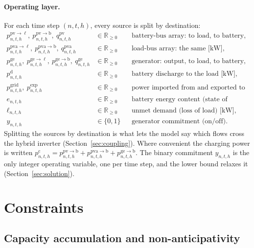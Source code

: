 \documentclass[11pt,a4paper]{article}
\theoremstyle{plain}
\theoremstyle{definition}
\newcommand{\Rpos}{\mathbb{R}_{\geq 0}}
\begin{document}
\paragraph{Operating layer.} For each time step $(n,t,h)$, every source is split by
destination:
\begin{align}
  p^{\mathrm{pv}\to\ell}_{n,t,h},\ p^{\mathrm{pv}\to\mathrm{b}}_{n,t,h},\
  q^{\mathrm{pv}}_{n,t,h} &\in \Rpos
    && \text{battery-bus array: to load, to battery, curtailed [kW],}\\
  p^{\mathrm{pva}\to\ell}_{n,t,h},\ p^{\mathrm{pva}\to\mathrm{b}}_{n,t,h},\
  q^{\mathrm{pva}}_{n,t,h} &\in \Rpos
    && \text{load-bus array: the same [kW],}\\
  p^{\mathrm{ge}}_{n,t,h},\ p^{\mathrm{ge}\to\ell}_{n,t,h},\
  p^{\mathrm{ge}\to\mathrm{b}}_{n,t,h},\ q^{\mathrm{ge}}_{n,t,h} &\in \Rpos
    && \text{generator: output, to load, to battery, spilled [kW],}\\
  p^{\mathrm{d}}_{n,t,h} &\in \Rpos && \text{battery discharge to the load [kW],}\\
  p^{\mathrm{grid}}_{n,t,h},\ p^{\mathrm{exp}}_{n,t,h} &\in \Rpos
    && \text{power imported from and exported to the grid [kW],}\\
  e_{n,t,h} &\in \Rpos && \text{battery energy content (state of charge) [kWh],}\\
  \ell_{n,t,h} &\in \Rpos && \text{unmet demand (loss of load) [kW],}\\
  y_{n,t,h} &\in \{0,1\} && \text{generator commitment (on/off).}
\end{align}
Splitting the sources by destination is what lets the model say which flows cross the
hybrid inverter (Section~\ref{sec:coupling}). Where convenient the charging power is
written
$p^{\mathrm{c}}_{n,t,h}=p^{\mathrm{pv}\to\mathrm{b}}_{n,t,h}+p^{\mathrm{pva}\to\mathrm{b}}_{n,t,h}
+p^{\mathrm{ge}\to\mathrm{b}}_{n,t,h}$. The binary commitment $y_{n,t,h}$ is the only integer
operating variable, one per time step, and the lower bound relaxes it
(Section~\ref{sec:solution}).

\section{Constraints}
\label{sec:constraints}

\subsection{Capacity accumulation and non-anticipativity}
\label{sec:capacity}
\end{document}
